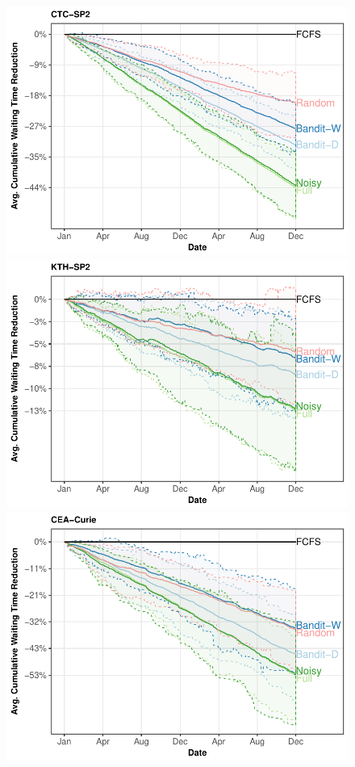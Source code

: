 \documentclass[sigconf,anonymous]{acmart}
\begin{document}
\begin{figure}[]
  \centering
  \includegraphics[scale=0.6]{figures/CTC-SP2.pdf}
  \includegraphics[scale=0.6]{figures/KTH-SP2.pdf}\\
  \includegraphics[scale=0.6]{figures/CEA-Curi.pdf}

\end{figure}
\end{document}
